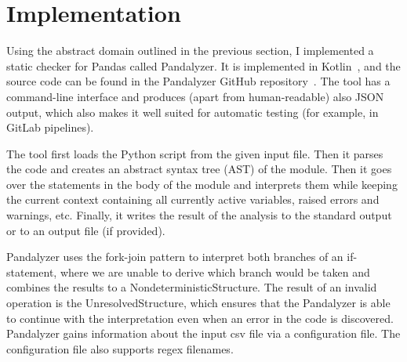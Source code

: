 \section{Implementation}

Using the abstract domain outlined in the previous section, I implemented a static checker for Pandas called Pandalyzer.
It is implemented in Kotlin~\cite{kotlinDocs}, and the source code can be found in the Pandalyzer GitHub
repository~\cite{pandalyzer}.
The tool has a command-line interface and produces (apart from human-readable) also JSON output,
which also makes it well suited for automatic testing (for example, in GitLab pipelines).

The tool first loads the Python script from the given input file.
Then it parses the code and creates an abstract syntax tree (AST) of the module.
Then it goes over the statements in the body of the module and interprets them while keeping the current context
containing all currently active variables, raised errors and warnings, etc.
Finally, it writes the result of the analysis to the standard output or to an output file (if provided).

Pandalyzer uses the fork-join pattern to interpret both branches of an if-statement, where we are unable to derive which
branch would be taken and combines the results to a NondeterministicStructure.
The result of an invalid operation is the UnresolvedStructure, which ensures that the Pandalyzer is able to continue
with the interpretation even when an error in the code is discovered.
Pandalyzer gains information about the input csv file via a configuration file.
The configuration file also supports regex filenames.